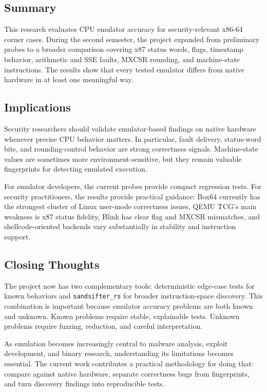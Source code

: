
\subsection{Summary}

This research evaluates CPU emulator accuracy for security-relevant x86-64 corner cases. During the second semester, the project expanded from preliminary probes to a broader comparison covering x87 status words, flags, timestamp behavior, arithmetic and SSE faults, MXCSR rounding, and machine-state instructions. The results show that every tested emulator differs from native hardware in at least one meaningful way.

\subsection{Implications}

Security researchers should validate emulator-based findings on native hardware whenever precise CPU behavior matters. In particular, fault delivery, status-word bits, and rounding-control behavior are strong correctness signals. Machine-state values are sometimes more environment-sensitive, but they remain valuable fingerprints for detecting emulated execution.

For emulator developers, the current probes provide compact regression tests. For security practitioners, the results provide practical guidance: Box64 currently has the strongest cluster of Linux user-mode correctness issues, QEMU TCG's main weakness is x87 status fidelity, Blink has clear flag and MXCSR mismatches, and shellcode-oriented backends vary substantially in stability and instruction support.

\subsection{Closing Thoughts}

The project now has two complementary tools: deterministic edge-case tests for known behaviors and \texttt{sandsifter\_rs} for broader instruction-space discovery. This combination is important because emulator accuracy problems are both known and unknown. Known problems require stable, explainable tests. Unknown problems require fuzzing, reduction, and careful interpretation.

As emulation becomes increasingly central to malware analysis, exploit development, and binary research, understanding its limitations becomes essential. The current work contributes a practical methodology for doing that: compare against native hardware, separate correctness bugs from fingerprints, and turn discovery findings into reproducible tests.
